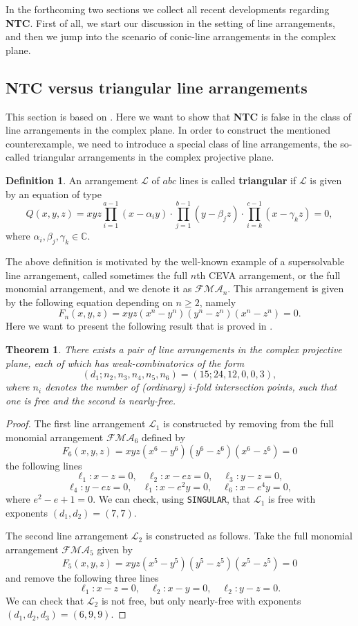 \documentclass[12pt]{article}
\theoremstyle{plain}
\newtheorem{theorem}[thm]{Theorem}
\theoremstyle{definition}
\newtheorem{definition}[thm]{Definition}
\renewcommand\geq{\geqslant}
\begin{document}
In the forthcoming two sections we collect all recent developments regarding \textbf{NTC}. First of all, we start our discussion in the setting of line arrangements, and then we jump into the scenario of conic-line arrangements in the complex plane.

\subsection{\textbf{NTC} versus triangular line arrangements}

This section is based on \cite{Mar}. Here we want to show that \textbf{NTC} is false in the class of line arrangements in the complex plane. In order to construct the mentioned counterexample, we need to introduce a special class of line arrangements, the so-called triangular arrangements in the complex projective plane.
\begin{definition}
An arrangement $\mathcal{L}$ of $abc$ lines is called \textbf{triangular} if $\mathcal{L}$ is given by an equation of type
$$Q(x,y,z) = xyz \prod_{i=1}^{a-1}(x-\alpha_{i}y)\cdot  \prod_{j=1}^{b-1}(y-\beta_{j}z) \cdot  \prod_{i=k}^{c-1}(x-\gamma_{k}z)=0,$$
where $\alpha_{i},\beta_{j},\gamma_{k} \in \mathbb{C}$.
\end{definition}
The above definition is motivated by the well-known example of a supersolvable line arrangement, called sometimes the full $n$th CEVA arrangement, or the full monomial arrangement, and we denote it as $\mathcal{FMA}_{n}$. This arrangement is given by the following equation depending on $n\geq 2$, namely
$$F_{n}(x,y,z) =  xyz(x^{n}-y^{n})(y^{n}-z^{n})(x^{n}-z^{n})=0.$$
Here we want to present the following result that is proved in \cite[Theorem 6.2]{Mar}.
\begin{theorem}
\label{pair}
There exists a pair of line arrangements in the complex projective plane, each of which has weak-combinatorics of the form
$$(d_{1};n_{2},n_{3},n_{4},n_{5},n_{6}) = (15; 24 ,12, 0, 0, 3),$$
where $n_{i}$ denotes the number of (ordinary) $i$-fold intersection points, such that one is free and the second is nearly-free.
\end{theorem}
\begin{proof}
The first line arrangement $\mathcal{L}_{1}$ is constructed by removing from the full monomial arrangement $\mathcal{FMA}_{6}$ defined by
$$F_{6}(x,y,z) = xyz(x^{6}-y^{6})(y^{6}-z^{6})(x^{6}-z^{6}) =0$$
the following lines
$$\ell_{1} : x-z=0, \quad \ell_{2} : x-ez=0, \quad \ell_{3} : y-z=0, $$
$$\ell_{4} : y-ez=0, \quad \ell_{1} : x-e^{2}y=0, \quad \ell_{6} : x-e^{4}y=0,$$
where $e^{2}-e+1=0$.
We can check, using \verb}SINGULAR}, that $\mathcal{L}_{1}$ is free with exponents $(d_{1},d_{2}) = (7,7)$. 

The second line arrangement $\mathcal{L}_{2}$ is constructed as follows. Take the full monomial arrangement $\mathcal{FMA}_{5}$ given by 
$$F_{5}(x,y,z) = xyz(x^{5}-y^{5})(y^{5}-z^{5})(x^{5}-z^{5}) =0$$
and remove the following three lines
$$\ell_{1} : x-z = 0, \quad \ell_{2} : x-y = 0, \quad \ell_{2} : y-z = 0.$$
We can check that $\mathcal{L}_{2}$ is not free, but only nearly-free with exponents $(d_{1},d_{2},d_{3}) = (6,9,9)$.
\end{proof}
\end{document}
